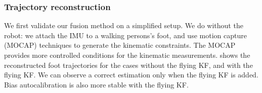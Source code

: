 \subsubsection{Trajectory reconstruction}

We first validate our fusion method on a simplified setup. We do without the robot: we attach the IMU to a walking persons's foot, and use motion capture (MOCAP) techniques to generate the kinematic constraints. 
The MOCAP provides more controlled conditions for the kinematic measurements.
 shows the reconstructed foot trajectories for the cases without the flying KF, and with the flying KF. We can observe a correct estimation only when the flying KF is added. Bias autocalibration is also more stable with the flying KF.

%


